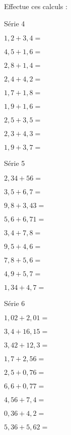 \begin{myenumerate}
\begin{multicols}{3}
\begin{Myenumerate}
\end{Myenumerate}
\end{multicols}
\item Effectue ces calculs :
\begin{multicols}{3}
\begin{center}
Série 4
\end{center}
\begin{Myenumerate}
\item$1,2+3,4=$\dotfill
\item$4,5+1,6=$\dotfill
\item$2,8+1,4=$\dotfill
\item$2,4+4,2=$\dotfill
\item$1,7+1,8=$\dotfill
\item$1,9+1,6=$\dotfill
\item$2,5+3,5=$\dotfill
\item$2,3+4,3=$\dotfill
\item$1,9+3,7=$\dotfill
\end{Myenumerate}
\par
\begin{center}
Série 5
\end{center}
\begin{Myenumerate}
\item$2,34+56=$\dotfill
\item$3,5+6,7=$\dotfill
\item$9,8+3,43=$\dotfill
\item$5,6+6,71=$\dotfill
\item$3,4+7,8=$\dotfill
\item$9,5+4,6=$\dotfill
\item$7,8+5,6=$\dotfill
\item$4,9+5,7=$\dotfill
\item$1,34+4,7=$\dotfill
\end{Myenumerate}
\par
\begin{center}
Série 6
\end{center}
\begin{Myenumerate}
\item$1,02+2,01=$\dotfill
\item$3,4+16,15=$\dotfill
\item$3,42+12,3=$\dotfill
\item$1,7+2,56=$\dotfill
\item$2,5+0,76=$\dotfill
\item$6,6+0,77=$\dotfill
\item$4,56+7,4=$\dotfill
\item$0,36+4,2=$\dotfill
\item$5,36+5,62=$\dotfill
\end{Myenumerate}
\end{multicols}
\end{myenumerate}
